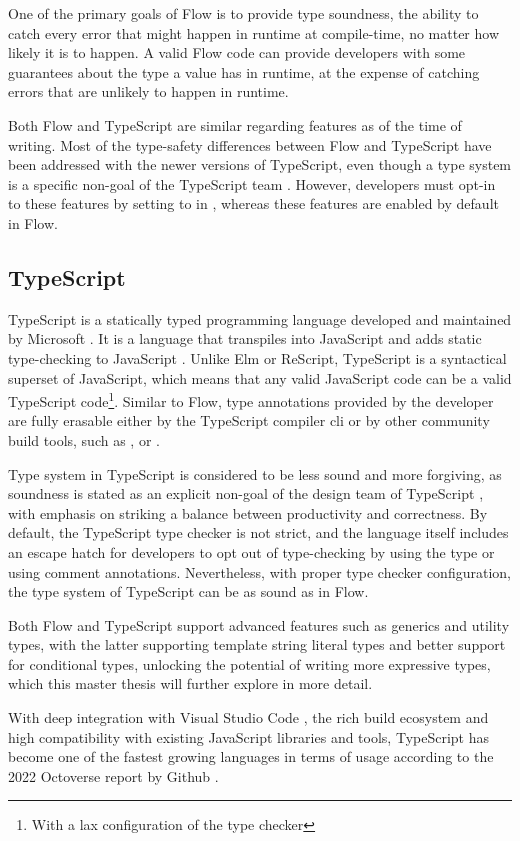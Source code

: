 One of the primary goals of Flow is to provide type soundness, the ability to catch every error that might happen in runtime at compile-time, no matter how likely it is to happen. A valid Flow code can provide developers with some guarantees about the type a value has in runtime, at the expense of catching errors that are unlikely to happen in runtime.

Both Flow and TypeScript are similar regarding features as of the time of writing. Most of the type-safety differences between Flow and TypeScript have been addressed with the newer versions of TypeScript, even though a  type system is a specific non-goal of the TypeScript team \cite{TypeScriptDesignGoals}. However, developers must opt-in to these features by setting  to  in , whereas these features are enabled by default in Flow.

\subsection{TypeScript}

TypeScript is a statically typed programming language developed and maintained by Microsoft \cite{TypeScriptJavaScriptSyntax}. It is a language that transpiles into JavaScript and adds static type-checking to JavaScript \cite{DocumentationTypeScriptJavaScript}. Unlike Elm or ReScript, TypeScript is a syntactical superset of JavaScript, which means that any valid JavaScript code can be a valid TypeScript code\footnote{With a lax configuration of the type checker}. Similar to Flow, type annotations provided by the developer are fully erasable either by the TypeScript compiler \acrshort{cli} or by other community build tools, such as \cite{BabelBabel2023}, \cite{EsbuildExtremelyFast} or \cite{SWCRustbasedPlatform}.

Type system in TypeScript is considered to be less sound and more forgiving, as soundness is stated as an explicit non-goal of the design team of TypeScript \cite{TypeScriptDesignGoals}, with emphasis on striking a balance between productivity and correctness. By default, the TypeScript type checker is not strict, and the language itself includes an escape hatch for developers to opt out of type-checking by using the  type or using  comment annotations. Nevertheless, with proper type checker configuration, the type system of TypeScript can be as sound as in Flow.

Both Flow and TypeScript support advanced features such as generics and utility types, with the latter supporting template string literal types and better support for conditional types, unlocking the potential of writing more expressive types, which this master thesis will further explore in more detail.

With deep integration with Visual Studio Code \cite{VisualStudioCode}, the rich build ecosystem and high compatibility with existing JavaScript libraries and tools, TypeScript has become one of the fastest growing languages in terms of usage according to the 2022 Octoverse report by Github \cite{Octoverse2022State}.
